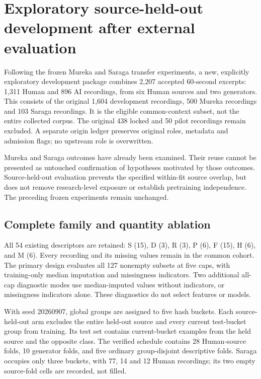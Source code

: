\section{Exploratory source-held-out development after external evaluation}
\label{sec:v5-exploratory-sourceheldout}

Following the frozen Mureka and Saraga transfer experiments, a new, explicitly
exploratory development package combines 2,207 accepted 60-second excerpts:
1,311 Human and 896 AI recordings, from six Human sources and two generators.
This consists of the original 1,604 development recordings, 500 Mureka
recordings and 103 Saraga recordings. It is the eligible common-context subset,
not the entire collected corpus. The original 438 locked and 50 pilot
recordings remain excluded. A separate origin ledger preserves original
roles, metadata and admission flags; no upstream role is overwritten.

Mureka and Saraga outcomes have already been examined. Their reuse cannot be
presented as untouched confirmation of hypotheses motivated by those outcomes.
Source-held-out evaluation prevents the specified within-fit source overlap,
but does not remove research-level exposure or establish pretraining
independence. The preceding frozen experiments remain unchanged.

\subsection{Complete family and quantity ablation}

All 54 existing descriptors are retained: S (15), D (3), R (3), P (6),
F (15), H (6), and M (6). Every recording and its missing values remain in
the common cohort. The primary design evaluates all 127 nonempty subsets at
five caps, with training-only median imputation and missingness indicators.
Two additional all-cap diagnostic modes use median-imputed values without
indicators, or missingness indicators alone. These diagnostics do not select
features or models.

With seed 20260907, global groups are assigned to five hash buckets. Each
source-held-out arm excludes the entire held-out source and every current
test-bucket group from training. Its test set contains current-bucket examples
from the held source and the opposite class. The verified schedule contains
28 Human-source folds, 10 generator folds, and five ordinary group-disjoint
descriptive folds. Saraga occupies only three buckets, with 77, 14 and 12
Human recordings; its two empty source-fold cells are recorded, not filled.

